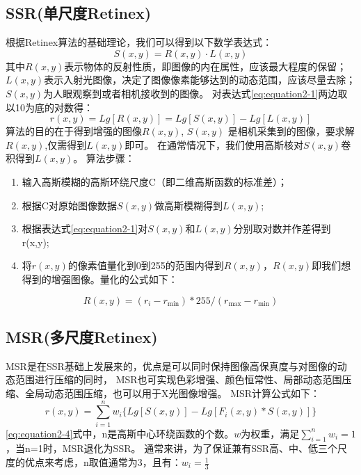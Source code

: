 \documentclass[lang=cn,newtx,10pt,scheme=chinese]{elegantbook}
\begin{document}
    \subsection{SSR(单尺度Retinex)}\label{subsec:ssr(retinex)}
    根据Retinex算法的基础理论，我们可以得到以下数学表达式：
    \begin{equation}
        S(x, y) = R(x, y) \cdot L(x, y)\label{eq:equation2-1}
    \end{equation}
    其中$R(x, y)$表示物体的反射性质，即图像的内在属性，应该最大程度的保留；$L(x,y)$表示入射光图像，决定了图像像素能够达到的动态范围，应该尽量去除；
    $S(x,y)$为人眼观察到或者相机接收到的图像。
    对表达式\ref{eq:equation2-1}两边取以10为底的对数得：
    \begin{equation}
        r(x,y) = Lg[R(x,y)] = Lg[S(x, y)] - Lg[L(x,y)]\label{eq:equation2-2}
    \end{equation}
    算法的目的在于得到增强的图像$R(x,y)$, $S(x,y)$ 是相机采集到的图像，要求解$R(x,y)$,仅需得到$L(x,y)$即可。
    在通常情况下，我们使用高斯核对$S(x,y)$卷积得到$L(x,y)$。
    算法步骤：
    \begin{enumerate}
        \item 输入高斯模糊的高斯环绕尺度C（即二维高斯函数的标准差）；
        \item 根据C对原始图像数据$S(x,y)$做高斯模糊得到$L(x,y)$;
        \item 根据表达式\ref{eq:equation2-1}对$S(x,y)$和$L(x,y)$分别取对数并作差得到r(x,y);
        \item 将$r(x,y)$的像素值量化到0到255的范围内得到$R(x,y)$，$R(x,y)$即我们想得到的增强图像。量化的公式如下：
    \end{enumerate}
    \begin{equation}
        R(x,y) = (r_i-r_{\min})*255/(r_{\max}-r_{\min})\label{eq:equation2-3}
    \end{equation}

    \subsection{MSR(多尺度Retinex)}\label{subsec:msr(retinex)}
    MSR是在SSR基础上发展来的，优点是可以同时保持图像高保真度与对图像的动态范围进行压缩的同时，
    MSR也可实现色彩增强、颜色恒常性、局部动态范围压缩、全局动态范围压缩，也可以用于X光图像增强。
    MSR计算公式如下：
    \begin{equation}
        r(x,y) = \sum_{i=1}^{n} w_i \{Lg[S(x,y)] - Lg[F_i(x,y) \ast S(x,y)]\} \label{eq:equation2-4}
    \end{equation}
    \ref{eq:equation2-4}式中，n是高斯中心环绕函数的个数。$w$为权重，满足$\sum_{i=1}^{n} w_i=1$，当n=1时，MSR退化为SSR。
    通常来讲，为了保证兼有SSR高、中、低三个尺度的优点来考虑，n取值通常为3，且有：$w_i=\frac{1}{3}$
\end{document}
